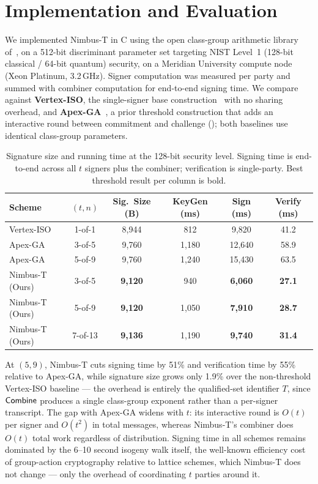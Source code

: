 \section{Implementation and Evaluation}
\label{sec:eval}

We implemented Nimbus-T in C using the open class-group arithmetic library of~\cite{synapse2025classgroup}, on a 512-bit discriminant parameter set targeting NIST Level~1 (128-bit classical / 64-bit quantum) security, on a Meridian University compute node (Xeon Platinum, 3.2\,GHz). Signer computation was measured per party and summed with combiner computation for end-to-end signing time. We compare against \textbf{Vertex-ISO}, the single-signer base construction~\cite{sterling2019hhs,beullens2020csifish} with no sharing overhead, and \textbf{Apex-GA}~\cite{voss2023apexga}, a prior threshold construction that adds an interactive round between commitment and challenge (); both baselines use identical class-group parameters.

\begin{table}[htb]
\caption{Signature size and running time at the 128-bit security level. Signing time is end-to-end across all $t$ signers plus the combiner; verification is single-party. Best threshold result per column is bold.}
\label{tab:comparison}
\centering
\small
\begin{tabular}{lccccc}
  \toprule
  \textbf{Scheme} & \textbf{$(t,n)$} & \textbf{Sig.\ Size (B)} & \textbf{KeyGen (ms)} & \textbf{Sign (ms)} & \textbf{Verify (ms)} \\
  \midrule
  Vertex-ISO      & 1-of-1 & 8{,}944 & 812   & 9{,}820  & 41.2 \\
  \midrule
  Apex-GA         & 3-of-5 & 9{,}760 & 1{,}180 & 12{,}640 & 58.9 \\
  Apex-GA         & 5-of-9 & 9{,}760 & 1{,}240 & 15{,}430 & 63.5 \\
  \midrule
  Nimbus-T (Ours) & 3-of-5 & \textbf{9{,}120} & 940   & \textbf{6{,}060}  & \textbf{27.1} \\
  Nimbus-T (Ours) & 5-of-9 & \textbf{9{,}120} & 1{,}050 & \textbf{7{,}910}  & \textbf{28.7} \\
  Nimbus-T (Ours) & 7-of-13 & \textbf{9{,}136} & 1{,}190 & \textbf{9{,}740}  & \textbf{31.4} \\
  \bottomrule
\end{tabular}
\end{table}

At $(5,9)$, Nimbus-T cuts signing time by 51\% and verification time by 55\% relative to Apex-GA, while signature size grows only 1.9\% over the non-threshold Vertex-ISO baseline --- the overhead is entirely the qualified-set identifier $T$, since $\mathsf{Combine}$ produces a single class-group exponent rather than a per-signer transcript. The gap with Apex-GA widens with $t$: its interactive round is $O(t)$ per signer and $O(t^2)$ in total messages, whereas Nimbus-T's combiner does $O(t)$ total work regardless of distribution. Signing time in all schemes remains dominated by the 6--10 second isogeny walk itself, the well-known efficiency cost of group-action cryptography relative to lattice schemes, which Nimbus-T does not change --- only the overhead of coordinating $t$ parties around it.
